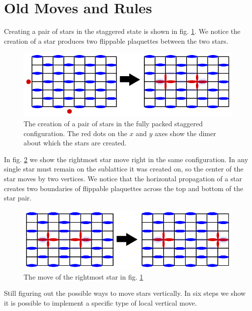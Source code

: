 \documentclass[aps,floatfix,11pt]{revtex4-1}
\begin{document}
\section{Old Moves and Rules}

Creating a pair of stars in the staggered state is shown in fig. \ref{fig:old_create_pair}. We notice
the creation of a star produces two flippable plaquettes between the two stars.

\begin{figure}[h]
    \centering
    \includegraphics[width=8.5 cm]{old_create_pair}
    \caption{The creation of a pair of stars in the fully packed staggered configuration. The red
    dots on the $x$ and $y$ axes show the dimer about which the stars are created.
\label{fig:old_create_pair}}
\end{figure}

\noindent In fig. \ref{fig:old_move_right} we show the rightmost star move right in the same
configuration. In any single star must remain on the sublattice it was created on, so the center of
the star moves by two vertices. We notice that the horizontal propagation of a star creates two boundaries of
flippable plaquettes across the top and bottom of the star pair. 

\begin{figure}[h]
    \centering
    \includegraphics[width=8.5 cm]{old_move_right}
    \caption{The move of the rightmost star in fig. \ref{fig:old_create_pair} \label{fig:old_move_right}}
\end{figure}

Still figuring out the possible ways to move stars vertically. In six steps we show it is possible
to implement a specific type of local vertical move. 
\\
\end{document}
